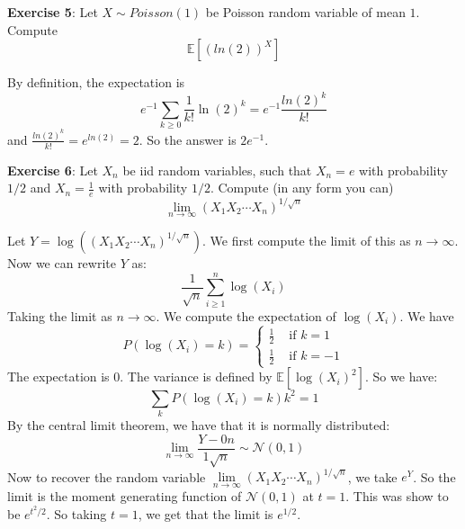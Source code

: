 \documentclass{article}
\begin{document}
\textbf{Exercise 5}: Let $X \sim Poisson(1)$ be Poisson random variable of mean $1$. Compute
    \begin{equation*}
        \mathbb{E}[(ln(2))^{X}]
    \end{equation*}
    \begin{answer}
        By definition, the expectation is 
            \begin{equation*}
                e^{-1}\sum_{k \geq 0} \dfrac{1}{k!}\ln(2)^{k} = e^{-1}\dfrac{ln(2)^{k}}{k!}
            \end{equation*}
        and $\frac{ln(2)^{k}}{k!} = e^{ln(2)} = 2$. So the answer is $2e^{-1}$.
    \end{answer}

\textbf{Exercise 6}: Let $X_{n}$ be iid random variables, such that $X_{n} = e$ with probability $1/2$ and $X_{n} = \frac{1}{e}$ with probability $1/2$. Compute (in any form you can)
    \begin{equation*}
        \lim\limits_{n \to \infty}(X_{1}X_{2}\cdots X_{n})^{1/\sqrt{n}}
    \end{equation*}
        \begin{answer}
            Let $Y = \log((X_{1} X_{2}\cdots X_{n})^{1/\sqrt{n}})$. We first compute the limit of this as $n \rightarrow \infty$. Now we can rewrite $Y$ as:
                \begin{equation*}
                    \dfrac{1}{\sqrt{n}}\sum_{i \geq 1}^{n} \log(X_{i})
                \end{equation*}
            Taking the limit as $n \rightarrow \infty$. We compute the expectation of $\log(X_{i})$. We have
                \begin{equation*}
                    P(\log(X_{i}) = k) = \begin{cases}
                        \frac{1}{2} &\text{ if } k = 1 \\
                        \frac{1}{2} &\text{ if } k = -1         
                    \end{cases}
                \end{equation*}
            The expectation is 0. The variance is defined by $\mathbb{E}[\log(X_{i})^{2}]$. So we have:
                \begin{equation*}
                    \sum_{k} P(\log(X_{i}) = k)k^{2} = 1
                \end{equation*}
            By the central limit theorem, we have that it is normally distributed:
                \begin{equation*}
                    \lim\limits_{n \to \infty} \dfrac{Y - 0n}{1\sqrt{n}} \sim \mathcal{N}(0, 1)
                \end{equation*}
            Now to recover the random variable $\lim\limits_{n \to \infty} (X_{1}X_{2} \cdots X_{n})^{1/\sqrt{n}}$, we take $e^{Y}$. So the limit is the moment generating function of $\mathcal{N}(0, 1)$ at $t = 1$. This was show to be $e^{t^{2}/2}$. So taking $t = 1$, we get that the limit is $e^{1/2}$.
        \end{answer}
\end{document}
